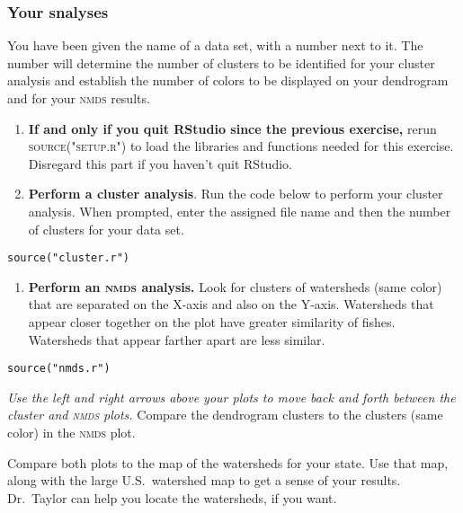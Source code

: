 \documentclass[11pt]{article}
\begin{document}
\subsubsection*{Your snalyses}

You have been given the name of a data set, with a number next to it. The number will determine  the number of clusters to be identified for your cluster analysis and establish the number
of colors to be displayed on your dendrogram and for your \textsc{nmds} results.

\begin{enumerate}[resume]
\item \textbf{If and only if you quit RStudio since the previous exercise,} rerun \textsc{source("setup.r")} to load the libraries and functions needed for this exercise. Disregard this part if you haven't quit RStudio.

\item \textbf{Perform a cluster analysis}. Run the code below to perform your cluster analysis. When prompted, enter the assigned file name and then the number of clusters for your data set.
\end{enumerate}

\begin{verbatim}
source("cluster.r")
\end{verbatim}


\begin{enumerate}[resume]
\item \textbf{Perform an \textsc{nmds} analysis.} Look for clusters of watersheds (same color) that are separated on the X-axis and also on the Y-axis. Watersheds that appear closer together on the plot have greater similarity of fishes. Watersheds that appear farther apart are less similar.

\end{enumerate}

\begin{verbatim}
source("nmds.r")
\end{verbatim}

\textit{Use the left and right arrows above your plots to move back and forth between the cluster and \textsc{nmds} plots.} Compare the dendrogram clusters to the clusters (same color) in the \textsc{nmds} plot.

Compare both plots to the map of the watersheds for your state.  Use that map, along with the large U.S.~watershed map to 
get a sense of your results. Dr.~Taylor can help you locate the watersheds, if you want.%
\end{document}
